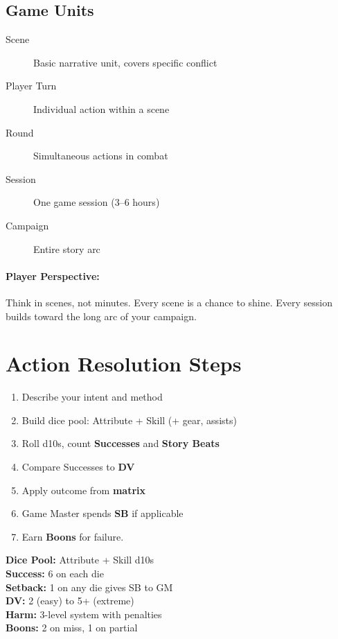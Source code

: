 \subsection*{Game Units}
\begin{description}
  \item[Scene] Basic narrative unit, covers specific conflict
  \item[Player Turn] Individual action within a scene
  \item[Round] Simultaneous actions in combat
  \item[Session] One game session (3--6 hours)
  \item[Campaign] Entire story arc
\end{description}

\paragraph{Player Perspective:}  
Think in scenes, not minutes. Every scene is a chance to shine. Every session builds toward the long arc of your campaign.

\section{Action Resolution Steps}

\begin{enumerate}
  \item Describe your intent and method
  \item Build dice pool: Attribute + Skill (+ gear, assists)
  \item Roll d10s, count \textbf{Successes} and \textbf{Story Beats}
  \item Compare Successes to \textbf{DV}
  \item Apply outcome from \textbf{matrix}
  \item Game Master spends \textbf{SB} if applicable
  \item Earn \textbf{Boons} for failure.
\end{enumerate}

\begin{tcolorbox}[colback=blue!5!white,colframe=blue!75!black,title=Quick Reference,fonttitle=\bfseries]
\textbf{Dice Pool:} Attribute + Skill d10s \\
\textbf{Success:} 6 on each die \\
\textbf{Setback:} 1 on any die gives SB to GM \\
\textbf{DV:} 2 (easy) to 5+ (extreme) \\
\textbf{Harm:} 3-level system with penalties \\
\textbf{Boons:} 2 on miss, 1 on partial 
\end{tcolorbox}

